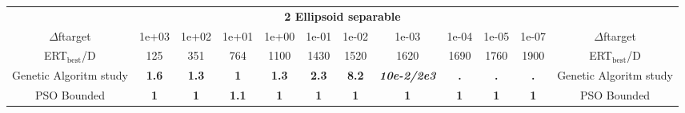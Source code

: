 \begin{tabular}{cccccccccccc}
 & \multicolumn{10}{c}{{\normalsize \textbf{2 Ellipsoid separable}}}\\
$\Delta$ftarget& 1e+03& 1e+02& 1e+01& 1e+00& 1e-01& 1e-02& 1e-03& 1e-04& 1e-05& 1e-07 & $\Delta$ftarget \\
ERT$_{\textrm{best}}$/D& 125& 351& 764& 1100& 1430& 1520& 1620& 1690& 1760& 1900 & ERT$_{\textrm{best}}$/D \\
\hline
Genetic Algoritm study & \textbf{1.6} & \textbf{1.3} & \textbf{1} & \textbf{1.3} & \textbf{2.3} & \textbf{8.2} & \textbf{\textit{10e-2}\textit{/2e3}} & \textbf{.} & \textbf{.} & \textbf{.} & Genetic Algoritm study \cite{add_an_entry_for_Genetic Algoritm study_in_bbob.bib}\\
PSO Bounded & \textbf{1} & \textbf{1} & \textbf{1.1} & \textbf{1} & \textbf{1} & \textbf{1} & \textbf{1} & \textbf{1} & \textbf{1} & \textbf{1} & PSO Bounded \cite{add_an_entry_for_PSO Bounded_in_bbob.bib}
\end{tabular}
